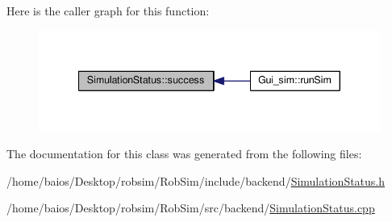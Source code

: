 Here is the caller graph for this function\-:
\nopagebreak
\begin{figure}[H]
\begin{center}
\leavevmode
\includegraphics[width=340pt]{class_simulation_status_a536b34bf815fc21ac19e47b3505f4fd8_icgraph}
\end{center}
\end{figure}




The documentation for this class was generated from the following files\-:\begin{DoxyCompactItemize}
\item 
/home/baios/\-Desktop/robsim/\-Rob\-Sim/include/backend/\hyperlink{_simulation_status_8h}{Simulation\-Status.\-h}\item 
/home/baios/\-Desktop/robsim/\-Rob\-Sim/src/backend/\hyperlink{_simulation_status_8cpp}{Simulation\-Status.\-cpp}\end{DoxyCompactItemize}
